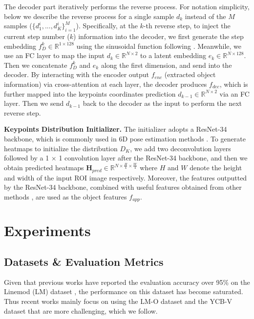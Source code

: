 \documentclass[10pt,twocolumn,letterpaper]{article}
\begin{document}
The decoder part iteratively performs the reverse process.
For notation simplicity, below we describe the reverse process for a single sample $d_k$ instead of the $M$ samples ($\{{d}^i_1,..., {d}^i_K\}^{M}_{i=1}$).
Specifically, at the $k$-th reverse step, to inject the current step number ($k$) information into the decoder, we first generate the step embedding $f^k_D \in \mathbb{R}^{1 \times 128}$ using the sinusoidal function following \cite{NEURIPS2020_DDPM, song2021denoising}.
Meanwhile, we use an FC layer to map the input $d_k \in \mathbb{R}^{N \times 2}$ to a latent embedding $e_{k} \in \mathbb{R}^{N \times 128}$.
Then we concatenate $f^k_D$ and $e_{k}$ along the first dimension, and send into the decoder.
By interacting with the encoder output $f_{enc}$ (extracted object information) via cross-attention at each layer,
the decoder produces $f_{dec}$, which is further mapped into the keypoints coordinates prediction $d_{k-1} \in \mathbb{R}^{N \times 2}$ via an FC layer. 
Then we send $d_{k-1}$ back to the decoder as the input to perform the next reverse step.



\noindent\textbf{Keypoints Distribution Initializer.} The initializer adopts a ResNet-34 backbone, which is commonly used in 6D pose estimation methods \cite{wang2021gdr,su2022zebrapose,castro2023crt}. 
To generate heatmaps to initialize the distribution $D_K$, we add two deconvolution layers followed by a 1 × 1 convolution layer after the ResNet-34 backbone, and then we obtain predicted heatmaps $\textbf{H}_{pred} \in \mathbb{R}^{N \times \frac{H}{4} \times \frac{W}{4}}$ where $H$ and $W$ denote the height and width of the input ROI image respectively.
Moreover, the features outputted by the ResNet-34 backbone, combined with useful features obtained from other methods \cite{su2022zebrapose, Lian_2023_ICCV}, are used as the object features $f_{app}$.


\section{Experiments}
\subsection{Datasets \& Evaluation Metrics}
Given that previous works \cite{di2021so, Zakharov2019DPOD6P, iwase2021repose} have reported the evaluation accuracy over 95\%  on the Linemod (LM) dataset \cite{hinterstoisser2013model}, the performance on this dataset has become saturated.
Thus recent works \cite{su2022zebrapose,castro2023crt} mainly focus on using the LM-O dataset \cite{brachmann2016uncertainty} and the YCB-V dataset \cite{xiang2018posecnn} that are more challenging, which we follow.
\end{document}

